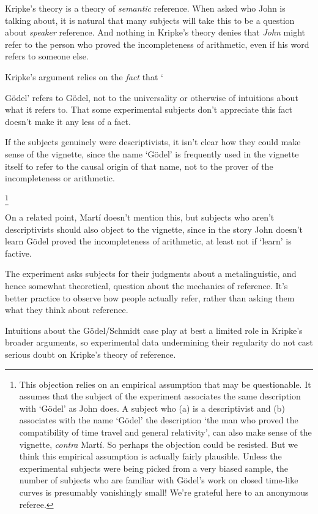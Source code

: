 \begin{enumerate}
\item Kripke's theory is a theory of \textit{semantic} reference. When asked who John is talking about, it is natural that many subjects will take this to be a question about \textit{speaker} reference. And nothing in Kripke's theory denies that \textit{John} might refer to the person who proved the incompleteness of arithmetic, even if his word refers to someone else. \citep{Ludwig2007, Deutsch2009}
\item Kripke's argument relies on the \textit{fact} that `{G\"{o}del' refers to G\"{o}del, not to the universality or otherwise of intuitions about what it refers to. That some experimental subjects don't appreciate this fact doesn't make it any less of a fact. \citep{Deutsch2009}
\item If the subjects genuinely were descriptivists, it isn't clear how they could make sense of the vignette, since the name `G\"{o}del' is frequently used in the vignette itself to refer to the causal origin of that name, not to the prover of the incompleteness or arithmetic.}\footnote{This objection relies on an empirical assumption that may be questionable. It assumes that the subject of the experiment associates the same description with `G\"{o}del' as John does. A subject who (a) is a descriptivist and (b) associates with the name `G\"{o}del' the description `the man who proved the compatibility of time travel and general relativity', can also make sense of the vignette, \textit{contra} Mart\'{i}. So perhaps the objection could be resisted. But we think this empirical assumption is actually fairly plausible. Unless the experimental subjects were being picked from a very biased sample, the number of subjects who are familiar with G\"{o}del's work on closed time-like curves is presumably vanishingly small! We're grateful here to an anonymous referee.} \par On a related point, Mart\'{i} doesn't mention this, but subjects who aren't descriptivists should also object to the vignette, since in the story John doesn't learn G\"{o}del proved the incompleteness of arithmetic, at least not if `learn' is factive. \citep{Marti2009}
\item The experiment asks subjects for their judgments about a metalinguistic, and hence somewhat theoretical, question about the mechanics of reference. It's better practice to observe how people actually refer, rather than asking them what they think about reference. \citep{Marti2009, Devitt2010}
\item Intuitions about the G\"{o}del\-/\-Schmidt case play at best a limited role in Kripke's broader arguments, so experimental data undermining their regularity do not cast serious doubt on Kripke's theory of reference. \citep{Devitt2010}
\end{enumerate}

